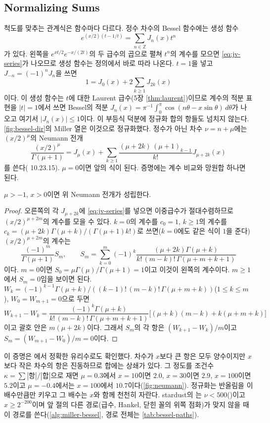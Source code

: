 \subsection{Normalizing Sums}

척도를 맞추는 관계식은 함수마다 다르다. 정수 차수의 Bessel 함수에는 생성 함수
\[
e^{(x/2)(t-1/t)}=\sum_{n\in\mathbb Z}J_n(x)t^n
\]
가 있다. 왼쪽을 $e^{xt/2}e^{-x/(2t)}$의 두 급수의 곱으로 펼쳐 $t^n$의 계수를 모으면 \cref{eq:jv-series}가 나오므로 생성 함수는 정의에서 바로 따라 나온다. $t=1$을 넣고 $J_{-n}=(-1)^nJ_n$을 쓰면
\[
1=J_0(x)+2\sum_{k\ge1}J_{2k}(x)
\]
이다. 이 생성 함수는 $t$에 대한 Laurent 급수(5장 \cref{thm:laurent})이므로 계수의 적분 표현을 $|t|=1$에서 쓰면 Bessel의 적분 $J_n(x)=\pi^{-1}\int_0^\pi\cos(n\theta-x\sin\theta)\,d\theta$가 나오고 여기서 $|J_n(x)|\le1$이다. 이 부등식 덕분에 정규화 합의 항들도 넘치지 않는다. \cref{fig:bessel-dir}의 Miller 열은 이것으로 정규화했다. 정수가 아닌 차수 $\nu=n+\mu$에는 $(x/2)^\mu$의 Neumann 전개
\[
\frac{(x/2)^\mu}{\Gamma(\mu+1)}=J_\mu(x)+\sum_{k\ge1}\frac{(\mu+2k)\,(\mu+1)_{k-1}}{k!}J_{\mu+2k}(x)
\]
를 쓴다(\cite{dlmf} 10.23.15). $\mu=0$이면 앞의 식이 된다. 증명에는 계수 비교와 망원합 하나면 된다.

\begin{proposition}
\label{prop:neumann}
$\mu>-1$, $x>0$이면 위 Neumann 전개가 성립한다.
\end{proposition}

\begin{proof}
오른쪽의 각 $J_{\mu+2k}$에 \cref{eq:jv-series}를 넣으면 이중급수가 절대수렴하므로 $(x/2)^{\mu+2m}$의 계수를 모을 수 있다. $k=0$의 계수를 $c_0=1$, $k\ge1$의 계수를 $c_k=(\mu+2k)\Gamma(\mu+k)/(\Gamma(\mu+1)k!)$로 쓰면($k=0$에도 같은 식이 $1$을 준다) $(x/2)^{\mu+2m}$의 계수는
\[
\frac{(-1)^m}{\Gamma(\mu+1)}S_m,\qquad S_m=\sum_{k=0}^m(-1)^k\frac{(\mu+2k)\Gamma(\mu+k)}{k!\,(m-k)!\,\Gamma(\mu+m+k+1)}
\]
이다. $m=0$이면 $S_0=\mu\Gamma(\mu)/\Gamma(\mu+1)=1$이고 이것이 왼쪽의 계수이다. $m\ge1$에서 $S_m=0$임을 보이면 된다. $W_k=(-1)^{k-1}\Gamma(\mu+k)/((k-1)!\,(m-k)!\,\Gamma(\mu+m+k))$($1\le k\le m$), $W_0=W_{m+1}=0$으로 두면
\[
W_{k+1}-W_k=\frac{(-1)^k\Gamma(\mu+k)}{k!\,(m-k)!\,\Gamma(\mu+m+k+1)}\bigl[(\mu+k)(m-k)+k(\mu+m+k)\bigr]
\]
이고 괄호 안은 $m(\mu+2k)$이다. 그래서 $S_m$의 각 항은 $(W_{k+1}-W_k)/m$이고 $S_m=(W_{m+1}-W_0)/m=0$이다.
\end{proof}

\noindent 이 증명은 에서 정확한 유리수로도 확인했다. 차수가 $x$보다 큰 항은 모두 양수이지만 $x$보다 작은 차수의 항은 진동하므로 합에는 상쇄가 있다. 그 정도를 조건수 $\kappa=\sum|\text{항}|/|\text{합}|$으로 재면 $\mu=0.3$에서 $x=10$이면 $2.0$, $x=30$이면 $2.9$, $x=100$이면 $5.2$이고 $\mu=-0.4$에서는 $x=100$에서 $10.7$이다(\cref{fig:neumann}). 정규화는 반올림을 이 배수만큼만 키우고 그 배수는 $x$와 함께 천천히 자란다. stardust의 는 $\nu<500$()이고 $x\ge2^{-200}$이며 앞 절의 다른 경로(급수, Hankel, 닫힌 꼴의 위쪽 점화)가 맞지 않을 때 이 경로를 쓴다(\cref{alg:miller-bessel}, 경로 전체는 \cref{tab:bessel-paths}).

